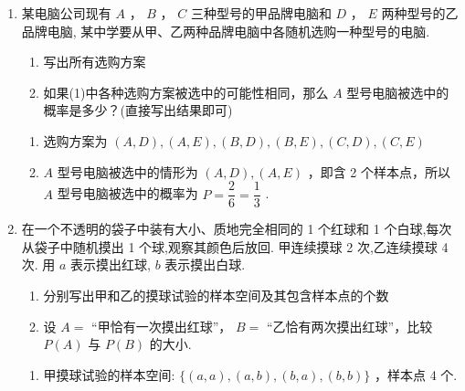 \begin{enumerate}
\begin{enumerate}
\begin{jieda}
\begin{enumerate}
                记事件 $A$ 表示“甲同学得 5 分”，则 $A = \{ {{BCD}}\}$ ，含有 1 个样本点，所以 $P\left( A\right)  = \dfrac{1}{10}$ .

                \item 该事件的样本空间 $\Omega  = \{ {A},{B},{C},{D}\}$ ，共 4 个样本点，每个样本点的发生是等可能的，故可以用古典概型计算概率，记事件 $B$ 表示“乙同学得 2 分”，则 $B = \{ {B},{C},{D}\}$ ，含有 3 个样本点，所以 $P\left( B\right)  = \dfrac{3}{4}$
            \end{enumerate}
        \end{jieda}
        
        \item 某电脑公司现有 $A$ ， $B$ ， $C$ 三种型号的甲品牌电脑和 $D$ ， $E$ 两种型号的乙品牌电脑, 某中学要从甲、乙两种品牌电脑中各随机选购一种型号的电脑.
        \begin{enumerate}
            \item 写出所有选购方案
            \item 如果(1)中各种选购方案被选中的可能性相同，那么 $A$ 型号电脑被选中的概率是多少？(直接写出结果即可)
        \end{enumerate}
        \begin{jieda}
            \begin{enumerate}
                \item 选购方案为 $\left( {A,D}\right) ,\left( {A,E}\right) ,\left( {B,D}\right) ,\left( {B,E}\right) ,\left( {C,D}\right) ,\left( {C,E}\right)$
                \item $A$ 型号电脑被选中的情形为 $\left( {A,D}\right) ,\left( {A,E}\right)$ ，即含 2 个样本点，所以 $A$ 型号电脑被选中的概率为 $P = \dfrac{2}{6} = \dfrac{1}{3}$ .
            \end{enumerate}
        \end{jieda}
        
        \item 在一个不透明的袋子中装有大小、质地完全相同的 1 个红球和 1 个白球,每次从袋子中随机摸出 1 个球,观察其颜色后放回. 甲连续摸球 2 次,乙连续摸球 4 次. 用 $a$ 表示摸出红球, $b$ 表示摸出白球.
        \begin{enumerate}
            \item 分别写出甲和乙的摸球试验的样本空间及其包含样本点的个数
            \item 设 $A =$ “甲恰有一次摸出红球”， $B =$ “乙恰有两次摸出红球”，比较 $P\left( A\right)$ 与 $P\left( B\right)$ 的大小.
        \end{enumerate}
        \begin{jieda}
            \begin{enumerate}
                \item 甲摸球试验的样本空间: $\{ \left( {a,a}\right) ,\left( {a,b}\right) ,\left( {b,a}\right) ,\left( {b,b}\right) \}$ ，样本点 4 个.
                

\end{enumerate}
\end{jieda}
\end{enumerate}
\end{enumerate}
